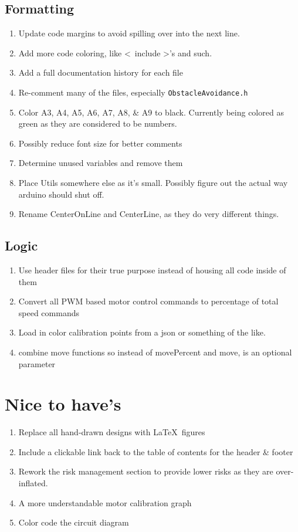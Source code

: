 \documentclass[11pt]{article}
\begin{document}
\subsection{Formatting}
\begin{enumerate}
    \item Update code margins to avoid spilling over into the next line.
    \item Add more code coloring, like \textless \ include \textgreater's and such.
    \item Add a full documentation history for each file
    \item Re-comment many of the files, especially \texttt{ObstacleAvoidance.h}
    \item Color A3, A4, A5, A6, A7, A8, \& A9 to black. Currently being colored as green as they are considered to be numbers.
    \item Possibly reduce font size for better comments
    \item Determine unused variables and remove them
    \item Place Utils somewhere else as it's small. Possibly figure out the actual way arduino should shut off.
    \item Rename CenterOnLine and CenterLine, as they do very different things.
\end{enumerate}

\subsection{Logic}
\begin{enumerate}
    \item Use header files for their true purpose instead of housing all code inside of them
    \item Convert all PWM based motor control commands to percentage of total speed commands
    \item Load in color calibration points from a json or something of the like.
    \item combine move functions so instead of movePercent and move, is an optional parameter
\end{enumerate}

\newpage
\section{Nice to have's}
\begin{enumerate}
    \item Replace all hand-drawn designs with \LaTeX \ figures
    \item Include a clickable link back to the table of contents for the header \& footer
    \item Rework the risk management section to provide lower risks as they are over-inflated.
    \item A more understandable motor calibration graph
    \item Color code the circuit diagram
\end{enumerate}
\end{document}
